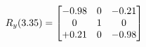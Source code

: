 \documentclass[preview]{standalone}
\begin{document}
\begin{align*}
\special{dvisvgm:raw <g id='unique000'>}R_{y}(3.35) = \begin{bmatrix}-0.98 & 0 & -0.21 \\0 & 1 & 0 \\+0.21 & 0 & -0.98\end{bmatrix}\special{dvisvgm:raw </g>}
\end{align*}
\end{document}
